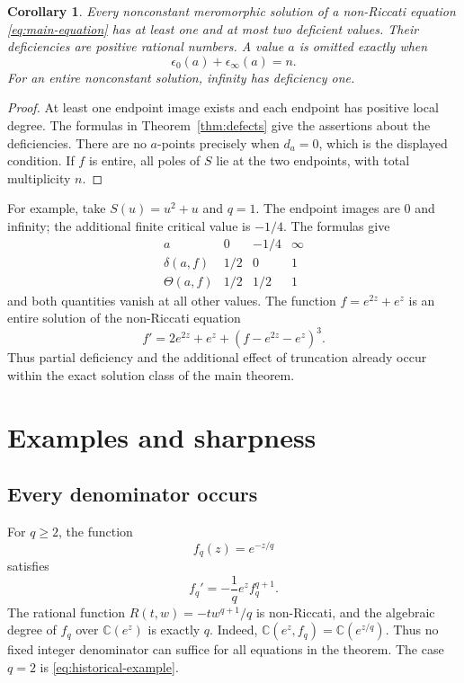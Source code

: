 \documentclass[11pt,reqno]{amsart}
\numberwithin{equation}{section}
\newtheorem{corollary}[theorem]{Corollary}
\theoremstyle{definition}
\theoremstyle{remark}
\newcommand{\C}{\mathbb C}
\begin{document}
\begin{corollary}
\label{cor:deficient-values}
Every nonconstant meromorphic solution of a non-Riccati equation
\eqref{eq:main-equation} has at least one and at most two
deficient values. Their deficiencies are positive rational
numbers. A value $a$ is omitted exactly when
\[
 \epsilon_0(a)+\epsilon_\infty(a)=n.
\]
For an entire nonconstant solution, infinity has deficiency one.
\end{corollary}

\begin{proof}
At least one endpoint image exists and each endpoint has
positive local degree. The formulas in Theorem~\ref{thm:defects}
give the assertions about the deficiencies. There are no
$a$-points precisely when $d_a=0$, which is the displayed
condition. If $f$ is entire, all poles of $S$ lie at the two
endpoints, with total multiplicity $n$.
\end{proof}

For example, take $S(u)=u^2+u$ and $q=1$. The endpoint images
are $0$ and infinity; the additional finite critical value is
$-1/4$. The formulas give
\[
 \begin{array}{c|ccc}
 a&0&-1/4&\infty\\ \hline
 \delta(a,f)&1/2&0&1\\
 \Theta(a,f)&1/2&1/2&1
 \end{array}
\]
and both quantities vanish at all other values. The function
$f=e^{2z}+e^z$ is an entire solution of the non-Riccati equation
\[
 f'=2e^{2z}+e^z+(f-e^{2z}-e^z)^3.
\]
Thus partial deficiency and the additional effect of truncation
already occur within the exact solution class of the main theorem.

\section{Examples and sharpness}
\label{sec:examples}

\subsection{Every denominator occurs}

For $q\geq2$, the function
\begin{equation}
 f_q(z)=e^{-z/q}
 \label{eq:all-denominators}
\end{equation}
satisfies
\begin{equation}
 f_q'=-\frac1q e^z f_q^{q+1}.
 \label{eq:all-denominators-equation}
\end{equation}
The rational function $R(t,w)=-tw^{q+1}/q$ is non-Riccati, and
the algebraic degree of $f_q$ over $\C(e^z)$ is exactly $q$.
Indeed, $\C(e^z,f_q)=\C(e^{z/q})$. Thus no fixed integer
denominator can suffice for all equations in the theorem.
The case $q=2$ is \eqref{eq:historical-example}.
\end{document}
